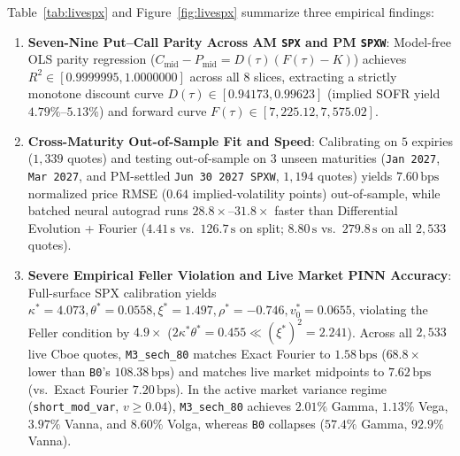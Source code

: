 \documentclass[11pt,a4paper]{article}
\begin{document}
Table~\ref{tab:livespx} and Figure~\ref{fig:livespx} summarize three empirical findings:
\begin{enumerate}
  \item \textbf{Seven-Nine Put--Call Parity Across AM \texttt{SPX} and PM \texttt{SPXW}}: Model-free OLS parity regression ($C_{\mathrm{mid}} - P_{\mathrm{mid}} = D(\tau)(F(\tau) - K)$) achieves $R^2 \in [0.9999995, 1.0000000]$ across all $8$ slices, extracting a strictly monotone discount curve $D(\tau) \in [0.94173, 0.99623]$ (implied SOFR yield $4.79\%\text{--}5.13\%$) and forward curve $F(\tau) \in [7{,}225.12, 7{,}575.02]$.
  \item \textbf{Cross-Maturity Out-of-Sample Fit and Speed}: Calibrating on $5$ expiries ($1{,}339$ quotes) and testing out-of-sample on $3$ unseen maturities (\texttt{Jan 2027}, \texttt{Mar 2027}, and PM-settled \texttt{Jun 30 2027 SPXW}, $1{,}194$ quotes) yields $\mathbf{7.60\,\mathrm{bps}}$ normalized price RMSE ($\mathbf{0.64}$ implied-volatility points) out-of-sample, while batched neural autograd runs $\mathbf{28.8\times\text{--}31.8\times}$ faster than Differential Evolution + Fourier ($4.41\,\mathrm{s}$ vs.\ $126.7\,\mathrm{s}$ on split; $8.80\,\mathrm{s}$ vs.\ $279.8\,\mathrm{s}$ on all $2{,}533$ quotes).
  \item \textbf{Severe Empirical Feller Violation and Live Market PINN Accuracy}: Full-surface SPX calibration yields $\kappa^* = 4.073, \theta^* = 0.0558, \xi^* = 1.497, \rho^* = -0.746, v_0^* = 0.0655$, violating the Feller condition by $\mathbf{4.9\times}$ ($2\kappa^*\theta^* = 0.455 \ll (\xi^*)^2 = 2.241$). Across all $2{,}533$ live Cboe quotes, \texttt{M3\_sech\_80} matches Exact Fourier to $\mathbf{1.58\,\mathrm{bps}}$ ($\mathbf{68.8\times}$ lower than \texttt{B0}'s $108.38\,\mathrm{bps}$) and matches live market midpoints to $\mathbf{7.62\,\mathrm{bps}}$ (vs.\ Exact Fourier $7.20\,\mathrm{bps}$). In the active market variance regime (\texttt{short\_mod\_var}, $v \ge 0.04$), \texttt{M3\_sech\_80} achieves $\mathbf{2.01\%}$ Gamma, $\mathbf{1.13\%}$ Vega, $\mathbf{3.97\%}$ Vanna, and $\mathbf{8.60\%}$ Volga, whereas \texttt{B0} collapses ($57.4\%$ Gamma, $92.9\%$ Vanna).
\end{enumerate}
\end{document}
